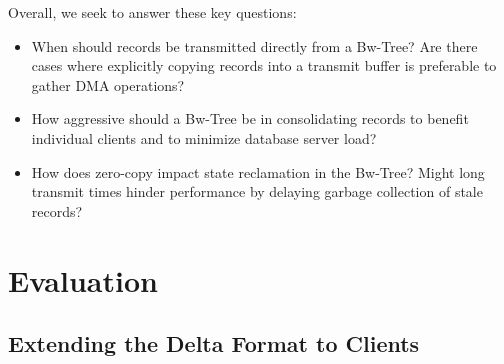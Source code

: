 Overall, we seek to answer these key questions:
\begin{itemize}
\item
When should records be transmitted directly from a Bw-Tree? Are there cases
where explicitly copying records into a transmit buffer is preferable to gather
DMA operations?
\item
How aggressive should a Bw-Tree be in consolidating records to benefit individual
clients and to minimize database server load?
\item
How does zero-copy impact state reclamation in the Bw-Tree? Might long transmit
times hinder performance by delaying garbage collection of stale records?
\end{itemize}











\section{Evaluation}

\subsection{Extending the Delta Format to Clients}


